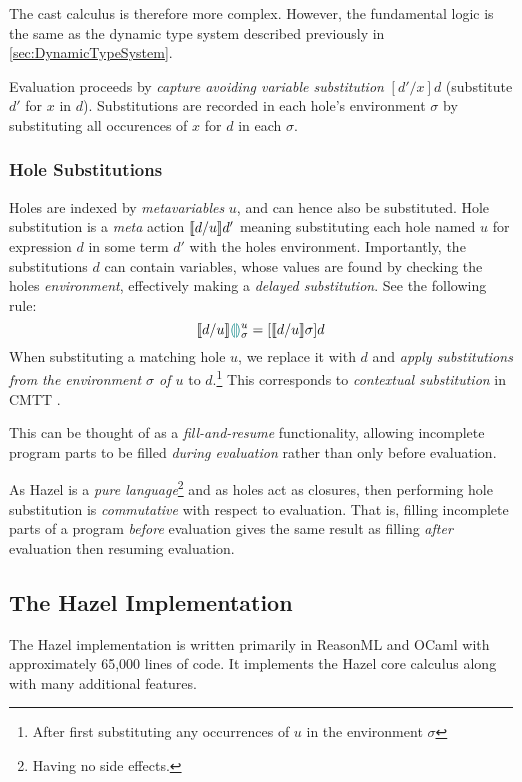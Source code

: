 The cast calculus is therefore more complex. However, the fundamental logic is the same as the dynamic type system described previously in \cref{sec:DynamicTypeSystem}.


Evaluation proceeds by \textit{capture avoiding variable substitution} $[d'/x]d$ (substitute $d'$ for $x$ in $d$). Substitutions are recorded in each hole's environment $\sigma$ by substituting all occurences of $x$ for $d$ in each $\sigma$. 

\subsubsection{Hole Substitutions}\label{sec:HoleSubstitution}
Holes are indexed by \textit{metavariables} $u$, and can hence also be substituted. Hole substitution is a \textit{meta} action $\llbracket d/u \rrbracket d'$ meaning substituting each hole named $u$ for expression $d$ in some term $d'$ with the holes environment. Importantly, the substitutions $d$ can contain variables, whose values are found by checking the holes \textit{environment}, effectively making a \textit{delayed substitution}. See the following rule:
 \[\llbracket d/u \rrbracket {\color{teal}\llparenthesis}  {\color{teal}\rrparenthesis}^u_\sigma = [\llbracket d/u \rrbracket \sigma]d\]
When substituting a matching hole $u$, we replace it with $d$ and \textit{apply substitutions from the environment $\sigma$ of $u$} to $d$.\footnote{After first substituting any occurrences of $u$ in the environment $\sigma$} This corresponds to \textit{contextual substitution} in CMTT \cite{CMTT}.
 
 This can be thought of as a \textit{fill-and-resume} functionality, allowing incomplete program parts to be filled \textit{during evaluation} rather than only before evaluation.

As Hazel is a \textit{pure language}\footnote{Having no side effects.} and as holes act as closures, then performing hole substitution is \textit{commutative} with respect to evaluation. That is, filling incomplete parts of a program \textit{before} evaluation gives the same result as filling \textit{after} evaluation then resuming evaluation.

\subsection{The Hazel Implementation}\label{sec:HazelImplementation}
The Hazel implementation \cite{HazelCode} is written primarily in ReasonML and OCaml with approximately 65,000 lines of code. It implements the Hazel core calculus along with many additional features. 

